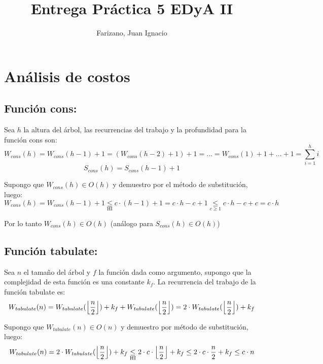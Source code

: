 \documentclass[11pt]{article}
\title{Entrega Práctica 5 EDyA II}
\author{Farizano, Juan Ignacio}
\date{}
\DeclarePairedDelimiter\floor{\lfloor}{\rfloor}
\begin{document}
\maketitle

\section*{Análisis de costos}
\subsection*{Función cons:}

Sea $h$ la altura del árbol, las recurrencias del trabajo y la profundidad
para la función cons son:
\begin{equation*}
  W_{cons}(h) = W_{cons}(h - 1) + 1 = (W_{cons}(h - 2) + 1) + 1 = ... =
  W_{cons}(1) + 1 + ... + 1 = \sum_{i=1}^{h} i
\end{equation*}
\begin{equation*}
  S_{cons}(h) = S_{cons}(h - 1) + 1
\end{equation*}

\noindent Supongo que $W_{cons}(h) \in O(h)$ y demuestro por el método de
substitución, luego: 
\begin{equation*}
  W_{cons}(h) = W_{cons}(h - 1) + 1 \underset{\text{HI}}{\leq} c \cdot (h-1) + 1
  = c \cdot h - c + 1 \underset{c \geq 1}{\leq} c \cdot h - c + c = c \cdot h
\end{equation*}
  
Por lo tanto $ W_{cons}(h) \in O(h) $ (análogo para $S_{cons}(h) \in O(h)$)


\subsection*{Función tabulate:}
Sea $n$ el tamaño del árbol y $f$ la función dada como argumento,
supongo que la complejidad de esta función es una constante $ k_f$.
La recurrencia del trabajo de la función tabulate es:
\begin{equation*}
  W_{tabulate}(n) = W_{tabulate}(\floor*{\frac{n}{2}}) + k_f + 
  W_{tabulate}(\floor*{\frac{n}{2}}) = 2 \cdot W_{tabulate}(\floor*{\frac{n}{2}})
  + k_f 
\end{equation*}

\noindent Supongo que $ W_{tabulate}(n) \in O(n) $ y demuestro por método
de substitución, luego: 
\begin{equation*}
  W_{tabulate}(n) = 2 \cdot W_{tabulate}(\floor*{\frac{n}{2}}) + k_f
  \underset{\text{HI}}{\leq} 2 \cdot c \cdot \floor*{\frac{n}{2}} + k_f \leq 
  2 \cdot c \cdot \frac{n}{2} + k_f \leq c \cdot n
\end{equation*}
\end{document}
